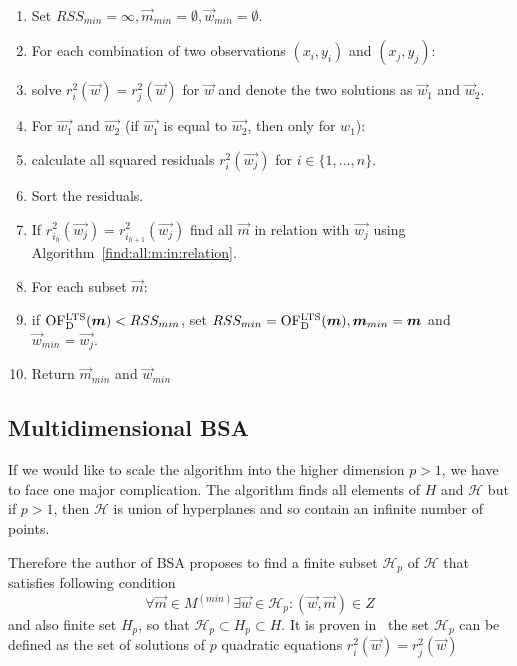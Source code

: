 \begin{algo}[BSA for the $p=1$] \label{bsa:one:dimensional}
    \mbox{}\vspace{\dimexpr-\baselineskip-\topsep}
\\
    \begin{enumerate}
        \item Set $RSS_{min} = \infty, \vec{m}_{min} = \emptyset, \vec{w}_{min} = \emptyset$.
        \item For each combination of two observations $(x_i, y_i)$ and $(x_j, y_j)$:
        \item solve $r^2_i(\vec{w}) = r^2_j(\vec{w})$ for $\vec{w}$ and denote the two solutions as $\vec{w}_1$ and $\vec{w}_2$.
        \item For $\vec{w_1}$ and $\vec{w_2}$ (if $\vec{w_1}$ is equal to $\vec{w_2}$, then only for $w_1$):
        \item calculate all squared residuals $r^{2}_i(\vec{w_j})$ for $i \in \{{1, \ldots,n\}}$.
        \item Sort the residuals.
        \item If $r^{2}_{i_h}(\vec{w_j}) = r^{2}_{i_{h+1}}(\vec{w_j})$ find all $\vec{m}$ in relation with $\vec{w_j}$ using Algorithm~\ref{find:all:m:in:relation}.
        \item For each subset $\vec{m}$:
        \item if $ \operatorname{OF^{LTS}_D}(\boldsymbol{m}) < RSS_{min}$, set $RSS_{min} = \operatorname{OF^{LTS}_D}(\boldsymbol{m}), \boldsymbol{m}_{min} = \boldsymbol{m}$ and $ \vec{w}_{min} = \vec{w_j} $.
        \item Return $\vec{m}_{min} $ and $ \vec{w}_{min}$
    \end{enumerate}
\end{algo}


\subsection{Multidimensional BSA}

If we would like to scale the algorithm into the higher dimension $p > 1$, we have to face one major complication. The algorithm finds all elements of $H$ and $\mathcal{H}$ but if $p > 1$, then  $\mathcal{H}$ is union of hyperplanes and so contain an infinite number of points.

Therefore the author of BSA proposes to find a finite subset $\mathcal{H}_p$ of $\mathcal{H}$ that satisfies following condition
\begin{equation} \label{hp:set:condition}
    \forall \vec{m} \in M^{(min)} \exists \vec{w} \in \mathcal{H}_p : (\vec{w},\vec{m}) \in Z
\end{equation}
and also finite set $H_p$, so that $\mathcal{H}_p \subset H_p \subset H$.
It is proven in~\cite{klouda2015exact} the set $\mathcal{H}_p$ can be defined as the set of solutions of $p$ quadratic equations
$ r^{2}_i(\vec{w}) = r^{2}_j(\vec{w})$

